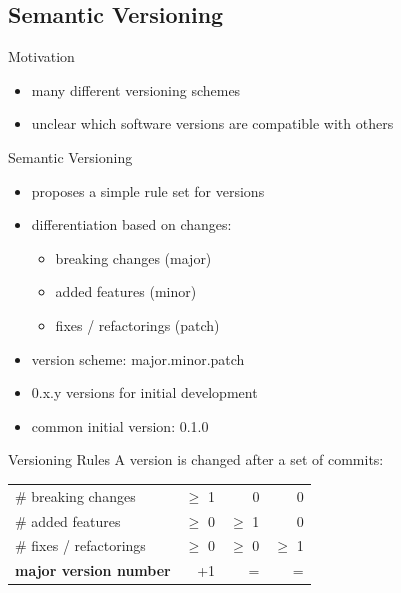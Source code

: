\subsection{Semantic Versioning}
\begin{frame}{\insertsubsection}
	\begin{fancycolumns}[b]
		\begin{note}{Motivation} 
			\begin{itemize}
				\item many different versioning schemes
				\item unclear which software versions are compatible with others
			\end{itemize}
		\end{note}
		\begin{definition}{Semantic Versioning } 
			\begin{itemize}
				\item proposes a simple rule set for versions
				\item differentiation based on changes:
				\begin{itemize}
					\item breaking changes (major)
					\item added features (minor)
					\item fixes / refactorings (patch)
				\end{itemize}
				\item version scheme: major.minor.patch
				\item 0.x.y versions for initial development
				\item common initial version: 0.1.0
			\end{itemize}
		\end{definition}
		\nextcolumn
		\vspace{-5mm}
		\begin{note}{Versioning Rules }
			A version is changed after a set of commits:
			\begin{table}
				\begin{tabular}{lrrr}
					\toprule
					\#{} breaking changes & $\geq$ 1 & 0 & 0 \\
					\#{} added features  & $\geq$ 0 & $\geq$ 1 & 0 \\
					\#{} fixes / refactorings  & $\geq$ 0  & $\geq$ 0  & $\geq$ 1 \\
					\midrule
					\textbf{major version number} & +1 & = & = \\

\end{tabular}
\end{table}
\end{note}
\end{fancycolumns}
\end{frame}
